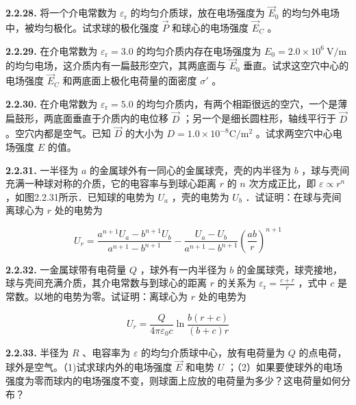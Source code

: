 \vfill
\newpage

\textbf{2.2.28.} 将一个介电常数为 $\varepsilon_{\mathrm{r}}$ 的均匀介质球，放在电场强度为 $\vec{E}_0$ 的均匀外电场中，被均匀极化。试求球的极化强度 $\vec{P}$ 和球心的电场强度 $\vec{E}_C$ 。

\vfill
\newpage

\textbf{2.2.29.} 在介电常数为 $\varepsilon_{\mathrm{r}} = 3.0$ 的均匀介质内存在电场强度为 $E_0 = 2.0 \times 10^{6} \mathrm{~V} / \mathrm{m}$ 的均匀电场，这介质内有一扁鼓形空穴，其两底面与 $\vec{E}_0$ 垂直。试求这空穴中心的电场强度 $\vec{E}_C$ 和两底面上极化电荷量的面密度 $\sigma'$ 。

\vfill
\newpage

\textbf{2.2.30.} 在介电常数为 $\varepsilon_{\mathrm{r}} = 5.0$ 的均匀介质内，有两个相距很远的空穴，一个是薄扁鼓形，两底面垂直于介质内的电位移 $\vec{D}$ ；另一个是细长圆柱形，轴线平行于 $\vec{D}$ 。空穴内都是空气。已知 $\vec{D}$ 的大小为 $D = 1.0 \times 10^{-8} \mathrm{C} / \mathrm{m}^2$ 。试求两空穴中心电场强度 $E$ 的值。

\vfill
\newpage

\textbf{2.2.31.} 一半径为 $a$ 的金属球外有一同心的金属球壳，壳的内半径为 $b$ ，球与壳间充满一种球对称的介质，它的电容率与到球心距离 $r$ 的 $n$ 次方成正比，即 $\varepsilon \propto r^n$ ，如图2.2.31所示．已知球的电势为 $U_{a}$ ，壳的电势为 $U_{b}$ ．试证明：在球与壳间离球心为 $r$ 处的电势为

\[
U _ {r} = \frac {a ^ {n + 1} U _ {a} - b ^ {n + 1} U _ {b}}{a ^ {n + 1} - b ^ {n + 1}} - \frac {U _ {a} - U _ {b}}{a ^ {n + 1} - b ^ {n + 1}} \left(\frac {a b}{r}\right) ^ {n + 1}
\]

\begin{center}
\end{center}

\vfill
\newpage

\textbf{2.2.32.} 一金属球带有电荷量 $Q$ ，球外有一内半径为 $b$ 的金属球壳，球壳接地，球与壳间充满介质，其介电常数与到球心的距离 $r$ 的关系为 $\displaystyle \varepsilon_{\mathrm{r}} = \frac{c + r}{r}$ ，式中 $c$ 是常数。以地的电势为零。试证明：离球心为 $r$ 处的电势为

\[
U _ {r} = \frac {Q}{4 \pi \varepsilon_ {0} c} \ln \frac {b (r + c)}{(b + c) r}
\]

\vfill
\newpage

\textbf{2.2.33.} 半径为 $R$ 、电容率为 $\varepsilon$ 的均匀介质球中心，放有电荷量为 $Q$ 的点电荷，球外是空气。（1)试求球内外的电场强度 $\vec{E}$ 和电势 $U$ ；（2）如果要使球外的电场强度为零而球内的电场强度不变，则球面上应放的电荷量为多少？这电荷量如何分布？

